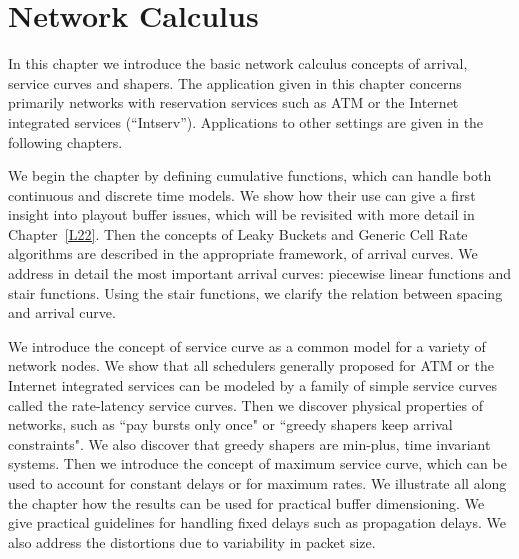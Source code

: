 \chapter[Network Calculus]{Network Calculus}%
%
%
%
%

In this chapter we introduce the basic network calculus concepts
of arrival, service curves and shapers.  The application given in
this chapter concerns primarily networks with reservation services
such as ATM or the Internet integrated services
(``Intserv''). Applications to other settings are
given in the following chapters.

We begin the chapter by defining cumulative functions, which can
handle both continuous and discrete time models.  We show how
their use can give a first insight into playout buffer issues,
which will be revisited with more detail in Chapter~\ref{L22}.
Then the concepts of Leaky Buckets and Generic Cell Rate
algorithms are described in the appropriate framework, of arrival
curves.  We address in detail the most important arrival curves:
piecewise linear functions and stair functions. Using the stair
functions, we clarify the relation between spacing and arrival
curve.

We introduce the concept of service curve as a common model for a
variety of network nodes. We show that all schedulers generally
proposed for ATM or the Internet integrated services can be
modeled by a family of simple service curves called the
rate-latency service curves.  Then we discover physical properties
of networks, such as ``pay bursts only once" or ``greedy shapers
keep arrival constraints".  We also discover that greedy shapers
are min-plus, time invariant systems. Then we introduce the
concept of maximum service curve, which can be used to account for
constant delays or for maximum rates. We illustrate all along the
chapter how  the results can be used for practical buffer
dimensioning. We give practical guidelines for handling fixed
delays such as propagation delays. We also address the distortions
due to variability in packet size.

